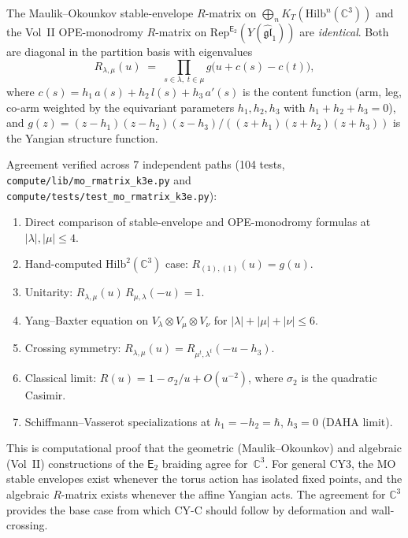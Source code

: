 \documentclass[11pt]{article}
\newcommand{\fgl}{\mathfrak{gl}}
\newcommand{\C}{\mathbb{C}}
\newcommand{\Etwo}{\mathsf{E}_2}
\newcommand{\Rep}{\mathrm{Rep}}
\begin{document}
\begin{theorem}[$R$-matrix agreement for $\C^3$]
\label{thm:mo-e2-agreement}
The Maulik--Okounkov stable-envelope $R$-matrix on
$\bigoplus_n K_T(\mathrm{Hilb}^n(\C^3))$
and the Vol~II OPE-monodromy $R$-matrix on
$\Rep^{\Etwo}(Y(\widehat{\fgl}_1))$ are \emph{identical}.
Both are diagonal in the partition basis with eigenvalues
\[
 R_{\lambda,\mu}(u) \;=\; \prod_{s \in \lambda,\; t \in \mu}
 g\bigl(u + c(s) - c(t)\bigr),
\]
where $c(s) = h_1\, a(s) + h_2\, l(s) + h_3\, a'(s)$ is the
content function \textup{(}arm, leg, co-arm weighted by the equivariant
parameters $h_1, h_2, h_3$ with $h_1 + h_2 + h_3 = 0$\textup{)},
and $g(z) = (z-h_1)(z-h_2)(z-h_3)/((z+h_1)(z+h_2)(z+h_3))$
is the Yangian structure function.
\end{theorem}

\begin{remark}
\label{rem:mo-verification}
Agreement verified across 7 independent paths
(104 tests, \texttt{compute/lib/mo\_rmatrix\_k3e.py}
and \texttt{compute/tests/test\_mo\_rmatrix\_k3e.py}):
\begin{enumerate}[label=\textup{(\roman*)}]
 \item Direct comparison of stable-envelope and OPE-monodromy
 formulas at $|\lambda|, |\mu| \leq 4$.
 \item Hand-computed $\mathrm{Hilb}^2(\C^3)$ case:
 $R_{(1),(1)}(u) = g(u)$.
 \item Unitarity: $R_{\lambda,\mu}(u)\, R_{\mu,\lambda}(-u) = 1$.
 \item Yang--Baxter equation on $V_\lambda \otimes V_\mu \otimes V_\nu$
 for $|\lambda| + |\mu| + |\nu| \leq 6$.
 \item Crossing symmetry:
 $R_{\lambda,\mu}(u) = R_{\mu^t, \lambda^t}(-u - h_3)$.
 \item Classical limit: $R(u) = 1 - \sigma_2/u + O(u^{-2})$, where
 $\sigma_2$ is the quadratic Casimir.
 \item Schiffmann--Vasserot specializations at $h_1 = -h_2 = \hbar$,
 $h_3 = 0$ (DAHA limit).
\end{enumerate}
This is computational proof that the geometric (Maulik--Okounkov)
and algebraic (Vol~II) constructions of the $\Etwo$ braiding agree
for~$\C^3$. For general CY3, the MO stable envelopes exist whenever
the torus action has isolated fixed points, and the algebraic
$R$-matrix exists whenever the affine Yangian acts.
The agreement for $\C^3$ provides the base case from which
CY-C should follow by deformation and wall-crossing.
\end{remark}
\end{document}

